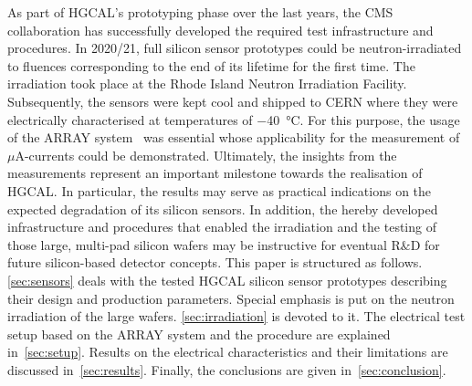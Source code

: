 As part of HGCAL's prototyping phase over the last years, the CMS collaboration has successfully developed the required test infrastructure and procedures.
In 2020/21, full silicon sensor prototypes could be neutron-irradiated to fluences corresponding to the end of its lifetime for the first time. 
The irradiation took place at the Rhode Island Neutron Irradiation Facility. 
Subsequently, the sensors were kept cool and shipped to CERN where they were electrically characterised at temperatures of \SI{-40}{\celsius}.
For this purpose, the usage of the ARRAY system~\cite{pitters:array2019} was essential whose applicability for the measurement of $\mu$A-currents could be demonstrated.
Ultimately, the insights from the measurements represent an important milestone towards the realisation of HGCAL.
In particular, the results may serve as practical indications on the expected degradation of its silicon sensors. 
In addition, the hereby developed infrastructure and procedures that enabled the irradiation and the testing of those large, multi-pad silicon wafers may be instructive for eventual R$\&$D for future silicon-based detector concepts.\newline
This paper is structured as follows.
\ref{sec:sensors} deals with the tested HGCAL silicon sensor prototypes describing their design and production parameters.
Special emphasis is put on the neutron irradiation of the large wafers. 
\ref{sec:irradiation} is devoted to it.
The electrical test setup based on the ARRAY system and the procedure are explained in~\ref{sec:setup}.
Results on the electrical characteristics and their limitations are discussed in~\ref{sec:results}.
Finally, the conclusions are given in~\ref{sec:conclusion}.